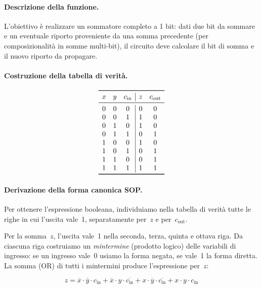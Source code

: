 \paragraph{Descrizione della funzione.}
L'obiettivo è realizzare un sommatore completo a 1 bit: dati due bit da sommare e un eventuale riporto proveniente da una somma precedente (per composizionalità in somme multi-bit), il circuito deve calcolare il bit di somma e il nuovo riporto da propagare.

\paragraph{Costruzione della tabella di verità.}
\[
\begin{array}{ccc|cc}
\toprule
x & y & c_{\text{in}} & z & c_{\text{out}} \\
\midrule
0 & 0 & 0 & 0 & 0 \\
0 & 0 & 1 & 1 & 0 \\
0 & 1 & 0 & 1 & 0 \\
0 & 1 & 1 & 0 & 1 \\
1 & 0 & 0 & 1 & 0 \\
1 & 0 & 1 & 0 & 1 \\
1 & 1 & 0 & 0 & 1 \\
1 & 1 & 1 & 1 & 1 \\
\bottomrule
\end{array}
\]

\paragraph{Derivazione della forma canonica SOP.}
Per ottenere l'espressione booleana, individuiamo nella tabella di verità tutte le righe in cui l'uscita vale~1, separatamente per~$z$ e per~$c_{\text{out}}$.

Per la somma~$z$, l'uscita vale~1 nella seconda, terza, quinta e ottava riga. Da ciascuna riga costruiamo un \emph{mintermine} (prodotto logico) delle variabili di ingresso: se un ingresso vale~0 usiamo la forma negata, se vale~1 la forma diretta. La somma (OR) di tutti i mintermini produce l'espressione per~$z$:

\begin{equation}
\label{eq:z-sop}
z = \overline{x} \cdot \overline{y} \cdot c_{\text{in}} + \overline{x} \cdot y \cdot \overline{c_{\text{in}}} + x \cdot \overline{y} \cdot \overline{c_{\text{in}}} + x \cdot y \cdot c_{\text{in}}
\end{equation}

